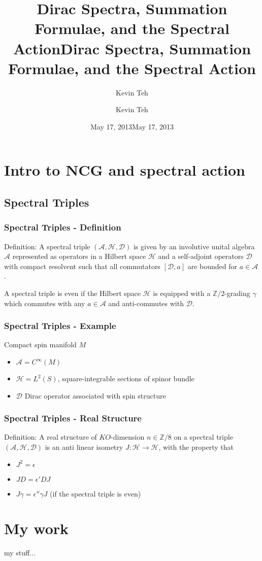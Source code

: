 \documentclass{beamer}
\title{Dirac Spectra, Summation Formulae, and the Spectral Action} \author{Kevin Teh} \date{May 17, 2013}
\title{Dirac Spectra, Summation Formulae, and the Spectral Action}
\author{Kevin Teh}
\institute{Caltech}
\date{May 17, 2013}
\def\Z{{\mathbb Z}}
\def\cA{{\mathcal A}}
\def\cD{{\mathcal D}}
\def\cH{{\mathcal H}}
\begin{document}
\begin{frame}
\titlepage
\end{frame}

\section{Intro to NCG and spectral action}

\subsection{Spectral Triples}
\begin{frame}
\frametitle{Spectral Triples - Definition}
Definition: A spectral triple $(\cA, \cH, \cD)$ is given by an involutive unital algebra $\cA$ represented as operators in a Hilbert space $\cH$ and a self-adjoint operators $\cD$ with compact resolvent such that all commutators $[\cD, a]$ are bounded for $a \in \cA$.
\pause

A spectral triple is even if the Hilbert space $\cH$ is equipped with a $\Z /2 $-grading $\gamma$ which commutes with any $a \in \cA$ and anti-commutes with $\cD$.
\end{frame}


\begin{frame}
\frametitle{Spectral Triples - Example}
Compact spin manifold $M$
\begin{itemize}
\item $\cA = C^{\infty}(M)$
\item $\cH = L^2(S)$, square-integrable sections of spinor bundle
\item $\cD$ Dirac operator associated with spin structure
\end{itemize}
\end{frame}


\begin{frame}
\frametitle{Spectral Triples - Real Structure}
Definition: A real structure of $KO$-dimension $n \in \Z/8$ on a spectral triple $(\cA, \cH, \cD)$ is an anti linear isometry $J: \cH \rightarrow \cH$, with the property that
\begin{itemize}
\item $J^2 = \epsilon$
\item $J D = \epsilon ' D J$
\item $J \gamma = \epsilon '' \gamma J $ (if the spectral triple is even)
\end{itemize}
\end{frame}

\section{My work}

\begin{frame}
my stuff...
\end{frame}
\end{document}

